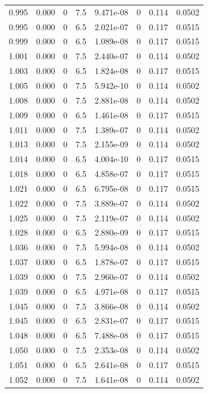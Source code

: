 \documentclass[preview]{standalone}
\begin{document}
{{{{{{{{{{{{\begin{tabular}{L{1.2cm}C{1.2cm} C{0.3cm}C{0.5cm} C{1.4cm}C{1.4cm} C{1.4cm}C{1.4cm}}
  0.995  &  0.000  & 0     & 7.5 &  9.471e-08  & 0  & 0.114 &  0.0502   \\ 
  0.995  &  0.000  & 0     & 6.5 &  2.021e-07  & 0  & 0.117 &  0.0515   \\ 
  0.999  &  0.000  & 0     & 6.5 &  1.089e-08  & 0  & 0.117 &  0.0515   \\ 
  1.001  &  0.000  & 0     & 7.5 &  2.440e-07  & 0  & 0.114 &  0.0502   \\ 
  1.003  &  0.000  & 0     & 6.5 &  1.824e-08  & 0  & 0.117 &  0.0515   \\ 
  1.005  &  0.000  & 0     & 7.5 &  5.942e-10  & 0  & 0.114 &  0.0502   \\ 
  1.008  &  0.000  & 0     & 7.5 &  2.881e-08  & 0  & 0.114 &  0.0502   \\ 
  1.009  &  0.000  & 0     & 6.5 &  1.461e-08  & 0  & 0.117 &  0.0515   \\ 
  1.011  &  0.000  & 0     & 7.5 &  1.389e-07  & 0  & 0.114 &  0.0502   \\ 
  1.013  &  0.000  & 0     & 7.5 &  2.155e-09  & 0  & 0.114 &  0.0502   \\ 
  1.014  &  0.000  & 0     & 6.5 &  4.004e-10  & 0  & 0.117 &  0.0515   \\ 
  1.018  &  0.000  & 0     & 6.5 &  4.858e-07  & 0  & 0.117 &  0.0515   \\ 
  1.021  &  0.000  & 0     & 6.5 &  6.795e-08  & 0  & 0.117 &  0.0515   \\ 
  1.022  &  0.000  & 0     & 7.5 &  3.889e-07  & 0  & 0.114 &  0.0502   \\ 
  1.025  &  0.000  & 0     & 7.5 &  2.119e-07  & 0  & 0.114 &  0.0502   \\ 
  1.028  &  0.000  & 0     & 6.5 &  2.880e-09  & 0  & 0.117 &  0.0515   \\ 
  1.036  &  0.000  & 0     & 7.5 &  5.994e-08  & 0  & 0.114 &  0.0502   \\ 
  1.037  &  0.000  & 0     & 6.5 &  1.878e-07  & 0  & 0.117 &  0.0515   \\ 
  1.039  &  0.000  & 0     & 7.5 &  2.960e-07  & 0  & 0.114 &  0.0502   \\ 
  1.039  &  0.000  & 0     & 6.5 &  4.971e-08  & 0  & 0.117 &  0.0515   \\ 
  1.045  &  0.000  & 0     & 7.5 &  3.866e-08  & 0  & 0.114 &  0.0502   \\ 
  1.045  &  0.000  & 0     & 6.5 &  2.831e-07  & 0  & 0.117 &  0.0515   \\ 
  1.048  &  0.000  & 0     & 6.5 &  7.488e-08  & 0  & 0.117 &  0.0515   \\ 
  1.050  &  0.000  & 0     & 7.5 &  2.353e-08  & 0  & 0.114 &  0.0502   \\ 
  1.051  &  0.000  & 0     & 6.5 &  2.641e-08  & 0  & 0.117 &  0.0515   \\ 
  1.052  &  0.000  & 0     & 7.5 &  1.641e-08  & 0  & 0.114 &  0.0502   \\ 
\hline 
\end{tabular} 

}}}}}}}}}}}}
\end{document}
